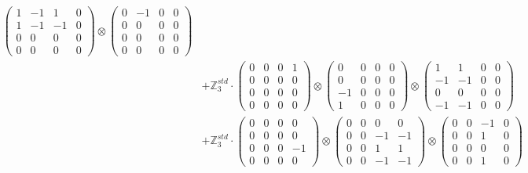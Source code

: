 \documentclass{article}
\begin{document}
{\begin{align}
            \begin{pmatrix} 1 & -1 & 1 & 0 \\ 1 & -1 & -1 & 0 \\ 0 & 0 & 0 & 0 \\ 0 & 0 & 0 & 0 \end{pmatrix} \otimes 
            \begin{pmatrix} 0 & -1 & 0 & 0 \\ 0 & 0 & 0 & 0 \\ 0 & 0 & 0 & 0 \\ 0 & 0 & 0 & 0 \end{pmatrix} \\ 
        &+ \label{Rs16-Rc11-Solution-5-c20} \mathbb{Z}_3^{std} \cdot 
            \begin{pmatrix} 0 & 0 & 0 & 1 \\ 0 & 0 & 0 & 0 \\ 0 & 0 & 0 & 0 \\ 0 & 0 & 0 & 0 \end{pmatrix} \otimes 
            \begin{pmatrix} 0 & 0 & 0 & 0 \\ 0 & 0 & 0 & 0 \\ -1 & 0 & 0 & 0 \\ 1 & 0 & 0 & 0 \end{pmatrix} \otimes 
            \begin{pmatrix} 1 & 1 & 0 & 0 \\ -1 & -1 & 0 & 0 \\ 0 & 0 & 0 & 0 \\ -1 & -1 & 0 & 0 \end{pmatrix} \\ 
        &+ \label{Rs16-Rc11-Solution-5-c21} \mathbb{Z}_3^{std} \cdot 
            \begin{pmatrix} 0 & 0 & 0 & 0 \\ 0 & 0 & 0 & 0 \\ 0 & 0 & 0 & -1 \\ 0 & 0 & 0 & 0 \end{pmatrix} \otimes 
            \begin{pmatrix} 0 & 0 & 0 & 0 \\ 0 & 0 & -1 & -1 \\ 0 & 0 & 1 & 1 \\ 0 & 0 & -1 & -1 \end{pmatrix} \otimes 
            \begin{pmatrix} 0 & 0 & -1 & 0 \\ 0 & 0 & 1 & 0 \\ 0 & 0 & 0 & 0 \\ 0 & 0 & 1 & 0 \end{pmatrix} \\ 

\end{align}}
\end{document}
